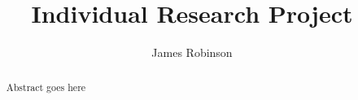 \documentclass[a4paper]{proc}
\begin{document}
	\title{Individual Research Project}
	\author{James Robinson}
	\maketitle

	\begin{abstract}
		Abstract goes here
	\end{abstract}
\end{document}
